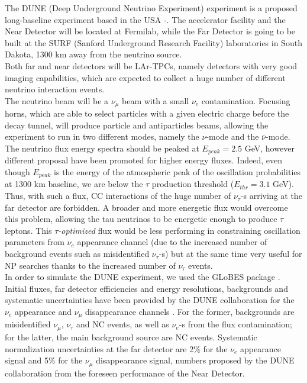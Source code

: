 \documentclass[12pt]{article}
\begin{document}
The DUNE (Deep Underground Neutrino Experiment) experiment is a proposed long-baseline experiment based in the USA \cite{Acciarri:2016crz}-\cite{Abi:2020evt}. The accelerator facility and the Near Detector will be located at Fermilab, while the Far Detector is going to be built at the SURF (Sanford Underground Research Facility) laboratories in South Dakota, 1300 km away from the neutrino source. \\
Both far and near detectors will be LAr-TPCs, namely detectors with very good imaging capabilities, which are expected to collect a huge number of different neutrino interaction events. \\
The neutrino beam will be a $\nu_\mu$ beam with a small $\nu_e$ contamination. Focusing horns, which are able to select particles with a given electric charge before the decay tunnel, will produce particle and antiparticles beams, allowing the experiment to run in two different modes, namely the $\nu$-mode and the $\bar{\nu}$-mode. The neutrino flux energy spectra should be peaked at $E_{peak}=2.5$ GeV, however different proposal have been promoted for higher energy fluxes.
Indeed, even though $E_{peak}$ is the energy of the atmospheric peak of the oscillation probabilities at 1300 km baseline, we are below the $\tau$ production threshold ($E_{thr}=3.1$ GeV). Thus, with such a flux,  CC interactions of the huge number of $\nu_\tau$-s arriving at the far detector are forbidden. A broader and more energetic flux would overcome this problem, allowing the tau neutrinos to be energetic enough to produce $\tau$ leptons. This {\it $\tau$-optimized} flux \cite{DUNEwebsite,Bi} would be less performing in constraining oscillation parameters from $\nu_e$ appearance channel (due to the increased number of background events such as misidentified $\nu_\tau$-s) but at the same time very useful for NP searches thanks to the increased number of $\nu_\tau$ events. \\
In order to simulate the DUNE experiment, we used the GLoBES package \cite{Huber:2004ka,Huber:2007ji}. Initial fluxes, far detector efficiencies and energy resolutions, backgrounds and systematic uncertainties have been provided by the DUNE collaboration for the $\nu_e$ appearance and $\nu_\mu$ disappearance channels \cite{Alion:2016uaj, Abi:2021arg}. For the former, backgrounds are misidentified $\nu_\mu$, $\nu_\tau$ and NC events, as well as $\nu_e$-s from the flux contamination; for the latter, the main background source are NC events. Systematic normalization uncertainties at the far detector are 2\% for the $\nu_e$ appearance signal and 5\% for the $\nu_\mu$ disappearance signal, numbers proposed by the DUNE collaboration from the foreseen performance of the Near Detector. \\
\end{document}

